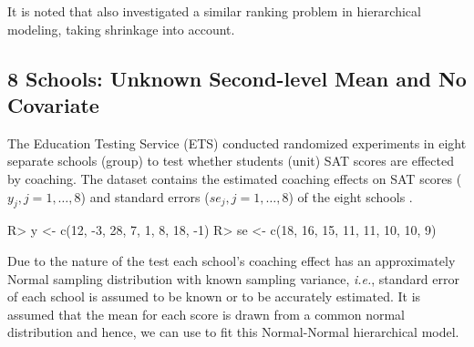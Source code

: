 \documentclass[article]{jss}
\begin{document}


It is noted that \cite{1995} also investigated a similar ranking problem in hierarchical modeling, taking shrinkage into account.


\subsection[Unknown Second-level Mean and No Covariate]{8 Schools: Unknown Second-level Mean and No Covariate}

The Education Testing Service (ETS) conducted randomized experiments in eight separate schools (group) to test whether students (unit) SAT scores are effected by coaching. The dataset contains the estimated coaching effects on SAT scores ($y_{j}, j=1, \ldots, 8$) and standard errors ($se_{j}, j=1, \ldots, 8$) of the eight schools \citep{1981}.
\begin{CodeChunk}
\begin{CodeInput}
R> y  <- c(12, -3, 28,  7,  1,  8, 18, -1)
R> se <- c(18, 16, 15, 11, 11, 10, 10,  9)
\end{CodeInput}
\end{CodeChunk}

Due to the nature of the test each school's coaching effect has an approximately Normal sampling distribution with known sampling variance, \emph{i.e.}, standard error of each school is assumed to be known or to be accurately estimated. It is assumed that the mean for each score is drawn from a common normal distribution and hence, we can use  to fit this Normal-Normal hierarchical model.
\end{document}
